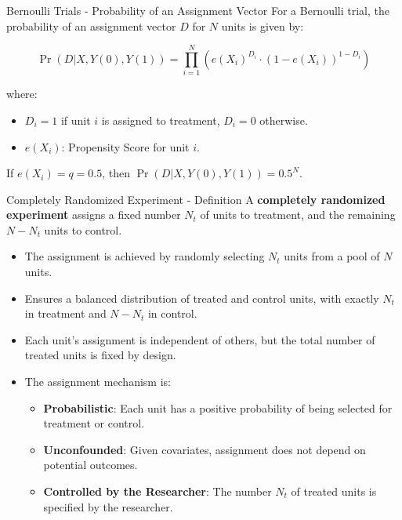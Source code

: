 \documentclass[xcolor=svgnames,t]{beamer}
\begin{document}
\begin{frame}{Bernoulli Trials - Probability of an Assignment Vector}
    For a Bernoulli trial, the probability of an assignment vector \( D \) for \( N \) units is given by:
    
    \[
    \Pr(D | X, Y(0), Y(1)) = \prod_{i=1}^N \left( e(X_i)^{D_i} \cdot (1 - e(X_i))^{1 - D_i} \right)
    \]
    
    where:
    \begin{itemize}
        \item \( D_i = 1 \) if unit \( i \) is assigned to treatment, \( D_i = 0 \) otherwise.
        \item \( e(X_i) \): Propensity Score for unit \( i \).
    \end{itemize}
    If \( e(X_i)= q = 0.5 \), then \( \Pr(D | X, Y(0), Y(1)) = 0.5^N \).
\end{frame}


\begin{frame}{Completely Randomized Experiment - Definition}
    A \textbf{completely randomized experiment} assigns a fixed number \( N_t \) of units to treatment, and the remaining \( N - N_t \) units to control.
    
    \begin{itemize}
        \item The assignment is achieved by randomly selecting \( N_t \) units from a pool of \( N \) units.
        \item Ensures a balanced distribution of treated and control units, with exactly \( N_t \) in treatment and \( N - N_t \) in control.
        \item Each unit's assignment is  independent of others, but the total number of treated units is fixed by design.
        \item The assignment mechanism is:
            \begin{itemize}
                \item \textbf{Probabilistic}: Each unit has a positive probability of being selected for treatment or control.
                \item \textbf{Unconfounded}: Given covariates, assignment does not depend on potential outcomes.
                \item \textbf{Controlled by the Researcher}: The number \( N_t \) of treated units is specified by the researcher.
            \end{itemize}
    \end{itemize}
\end{frame}
\end{document}
